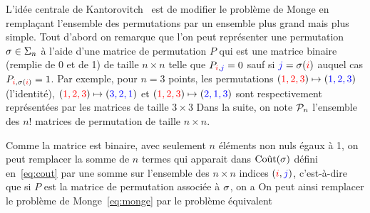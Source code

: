 
L'idée centrale de Kantorovitch~\cite{Kantorovich42} est de modifier le problème de Monge en remplaçant l'ensemble des permutations par un ensemble plus grand mais plus simple. Tout d'abord on remarque que l'on peut représenter une permutation $\sigma \in \Sigma_n$ à l'aide d'une matrice de permutation $P$ qui est une matrice binaire (remplie de 0 et de 1) de taille $n \times n$ telle que $P_{{\color{red}i},{\color{blue}j}} = 0$ sauf si ${\color{blue}j}=\sigma({\color{red}i})$ auquel cas $P_{{\color{red}i},\sigma({\color{red}i})} = 1$. Par exemple, pour $n=3$ points, les permutations 
$({\color{red}1,2,3}) \mapsto ({\color{blue}1,2,3})$ (l'identité), 
$({\color{red}1,2,3}) \mapsto ({\color{blue}3,2,1})$ et
$({\color{red}1,2,3}) \mapsto ({\color{blue}2,1,3})$ sont respectivement représentées par les matrices de taille $3 \times 3$
Dans la suite, on note $\mathcal{P}_n$ l'ensemble des $n!$ matrices de permutation de taille $n \times n$.

Comme la matrice est binaire, avec seulement $n$ éléments non nuls égaux à 1, on peut remplacer la somme de $n$ termes qui apparait dans $\text{Coût}(\sigma)$ défini en~\eqref{eq:cout} par une somme sur l'ensemble des $n \times n$ indices $({\color{red}i},{\color{blue}j})$, c'est-à-dire que si $P$ est la matrice de permutation associée à $\sigma$, on a 
On peut ainsi remplacer le problème de Monge~\eqref{eq:monge} par le problème équivalent 


